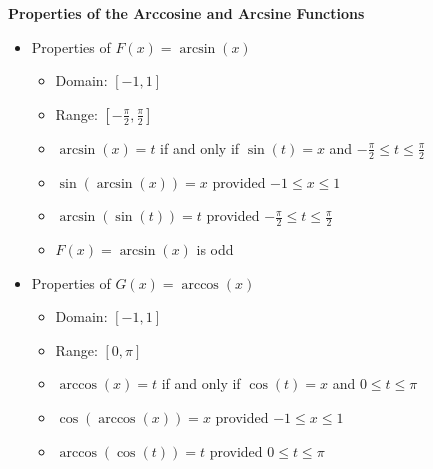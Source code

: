 \documentclass{ximera}
\begin{document}
\begin{theorem} \label{arccosinesinefunctionprops}  \textbf{Properties of the Arccosine and Arcsine Functions}     

\begin{itemize}

\item  Properties of $F(x) = \arcsin(x)$

\begin{itemize}
 
\item Domain:  $[-1,1]$

\item Range:  $\left[ -\frac{\pi}{2}, \frac{\pi}{2}\right]$

\item $\arcsin(x) = t$ if and only if $\sin(t) = x$ and $-\frac{\pi}{2} \leq t \leq \frac{\pi}{2}$

\item $\sin(\arcsin(x)) = x$ provided $-1 \leq x \leq 1$

\item $\arcsin(\sin(t)) = t$ provided $-\frac{\pi}{2} \leq t \leq \frac{\pi}{2}$ 

\item $F(x) = \arcsin(x)$ is odd

\end{itemize}

\item  Properties of $G(x)= \arccos(x)$

\begin{itemize}

\item Domain:  $[-1,1]$

\item Range:  $[0,\pi]$

\item $\arccos(x) = t$ if and only if  $\cos(t) = x$ and $0 \leq t \leq \pi$

\item $\cos(\arccos(x)) = x$ provided $-1 \leq x \leq 1$

\item $\arccos(\cos(t)) = t$ provided $0 \leq t \leq \pi$

\end{itemize}

\end{itemize}

\end{theorem}
\end{document}
